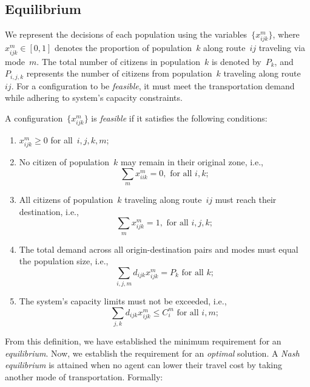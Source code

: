 \subsection{Equilibrium}
We represent the decisions of each population using the variables~$\{x_{ijk}^m\}$, where~$x_{ijk}^m \in [0,1]$ denotes the proportion of population~$k$ along route~$ij$ traveling via mode~$m$.
The total number of citizens in population~$k$ is denoted by~$P_k$, and~$P_{i,j,k}$ represents the number of citizens from population~$k$ traveling along route~$ij$. 
For a configuration to be \emph{feasible}, it must meet the transportation demand while adhering to system's capacity constraints.
%
\begin{definition} \label{def: feasibility}
A configuration~$\{x_{ijk}^{m}\}$ is \emph{feasible} if it satisfies the following conditions:
\begin{enumerate}
\item $x_{ijk}^m\geq 0$ for all~$i,j,k,m$;
\item No citizen of population~$k$ may remain in their original zone, i.e.,
\begin{equation*}
    \sum_{m}x_{iik}^m=0, \text{ for all }i,k;
\end{equation*}
\item All citizens of population~$k$ traveling along route~$ij$ must reach their destination, i.e.,
\begin{equation*}
    \sum_{m}x_{ijk}^m=1, \text{ for all }i,j,k;
\end{equation*}
\item The total demand across all origin-destination pairs and modes must equal the population size, i.e.,
\begin{equation*}
    \sum_{i,j,m} d_{ijk}x_{ijk}^m=P_k \text{ for all }k;
\end{equation*}
\item The system's capacity limits must not be exceeded, i.e., 
\begin{equation*}
    \sum_{j,k} d_{ijk} x_{ijk}^m \leq C_{i}^m \text{ for all }i,m;
\end{equation*}
\end{enumerate}
\end{definition}

From this definition, we have established the minimum requirement for an \emph{equilibrium}. Now, we establish the requirement for an \emph{optimal} solution. A \emph{Nash equilibrium} is attained when no agent can lower their travel cost by taking another mode of transportation. Formally: 

